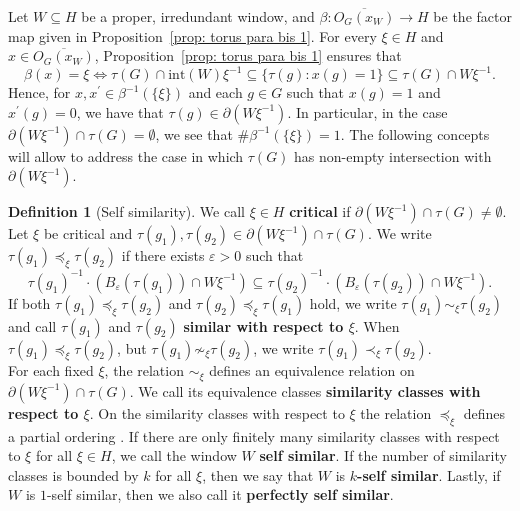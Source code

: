 \documentclass[titlepage,reqno,10pt]{amsart}
\theoremstyle{definition}
\newtheorem{definition}[theorem]{Definition}
\newcommand{\tm}{\subseteq}
\begin{document}
Let $W\subseteq H$ be a proper, irredundant window, and $\beta:\overline{O_G(x_W)}\to H$ be the factor map given in Proposition~\ref{prop: torus para bis 1}. For every $\xi\in H$ and $x\in \overline{O_G(x_W)}$, Proposition~\ref{prop: torus para bis 1} ensures that 
 $$ \beta(x) = \xi   \iff \tau(G)\cap \mathrm{int}(W)\xi^{-1}\subseteq \{\tau(g): x(g)=1\}\subseteq \tau(G)\cap W\xi^{-1}.$$
    Hence, for $x,x^\prime\in\beta^{-1}(\{\xi\})$ and each $g\in G$ such that $x(g)=1$ and $x^\prime(g)=0$, we have  that $\tau(g) \in \partial (W\xi^{-1})$.
In particular, in the case $\partial (W\xi^{-1})\cap \tau(G)=\emptyset$, we see that $\#\beta^{-1}(\{\xi\})=1$.
The following concepts will allow to address the case in which $\tau(G)$ has non-empty intersection with $\partial(W\xi^{-1})$.  
\begin{definition}[Self similarity]\label{similarity}
    We call $\xi\in H$ {\bf critical} if $\partial (W\xi^{-1})\cap \tau(G)\neq \emptyset$.
    Let $\xi$ be critical and $\tau(g_1),\tau(g_2)\in \partial (W\xi^{-1})\cap \tau(G)$.
    We write $\tau(g_1) \preccurlyeq_{\xi} \tau(g_2)$ if there exists $\varepsilon>0$ such that
    \begin{equation}\label{eq: self-similarity-order} \tau(g_1)^{-1}\cdot (B_\varepsilon(\tau(g_1))\cap W\xi^{-1})\tm \tau(g_2)^{-1}\cdot (B_\varepsilon(\tau(g_2))\cap W\xi^{-1}).\end{equation}
    If both $\tau(g_1) \preccurlyeq_{\xi} \tau(g_2)$ and $\tau(g_2) \preccurlyeq_{\xi} \tau(g_1)$ hold, we write $\tau(g_1) \sim_{\xi} \tau(g_2)$ and call $\tau(g_1)$ and $\tau(g_2)$ {\bf similar with respect to $\xi$}. When $\tau(g_1)\preccurlyeq_{\xi} \tau(g_2)$, but $\tau(g_1) \not\sim_{\xi} \tau(g_2)$, we write $\tau(g_1) \prec_{\xi} \tau(g_2)$.\\
    For each fixed $\xi$, the relation $\sim_{\xi}$ defines an equivalence relation on $\partial (W\xi^{-1})\cap \tau(G)$.
    We call its equivalence classes {\bf similarity classes with respect to $\xi$}.
    On the similarity classes with respect to $\xi$ the relation $\preccurlyeq_{\xi}$ defines a partial ordering .
    If there are only finitely many similarity classes with respect to $\xi$ for all $\xi\in H$, we call the window $W$ {\bf self similar}.
    If the number of similarity classes is bounded by $k$ for all $\xi$, then we say that $W$ is {\bf $k$-self similar}.
    Lastly, if $W$ is $1$-self similar, then we also call it {\bf perfectly self similar}.
\end{definition}
\end{document}
